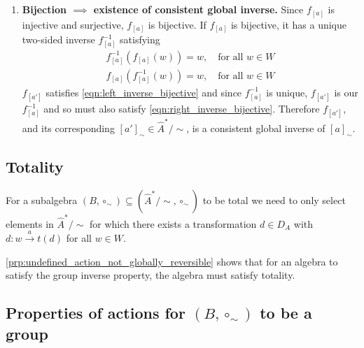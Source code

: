 \begin{proofE}
\begin{enumerate}
    \item \textbf{Bijection $\implies$ existence of consistent global inverse.}
    Since $f_{[a]}$ is injective and surjective, $f_{[a]}$ is bijective.
    If $f_{[a]}$ is bijective, it has a unique two-sided inverse $f_{[a]}^{-1}$ satisfying
    \begin{align}
        f_{[a]}^{-1}(f_{[a]}(w)) = w, \quad \text{for all $w \in W$} 
        \label{eqn:left_inverse_bijective}
        \\
        f_{[a]}(f_{[a]}^{-1}(w)) = w, \quad \text{for all $w \in W$}
        \label{eqn:right_inverse_bijective}
    \end{align}
    $f_{[a']}$ satisfies \cref{eqn:left_inverse_bijective} and since $f_{[a]}^{-1}$ is unique, $f_{[a']}$ is our $f_{[a]}^{-1}$ and so must also satisfy \cref{eqn:right_inverse_bijective}.
    Therefore $f_{[a']}$, and its corresponding $[a']_{\sim} \in \hat{A}^{*}/\sim$, is a consistent global inverse of $[a]_{\sim}$.
    \end{enumerate}
\end{proofE}

\subsection{Totality}


For a subalgebra $(B, \circ_{\sim}) \subseteq (\hat{A}^{*}/\sim, \circ_{\sim})$ to be total we need to only select elements in $\hat{A}^{*}/\sim$ for which there exists a transformation $d \in D_{A}$ with $d: w \xrightarrow{a} t(d)$ for all $w \in W$.

\cref{prp:undefined_action_not_globally_reversible} shows that for an algebra to satisfy the group inverse property, the algebra must satisfy totality.


\subsection{Properties of actions for $(B, \circ_{\sim})$ to be a group}

